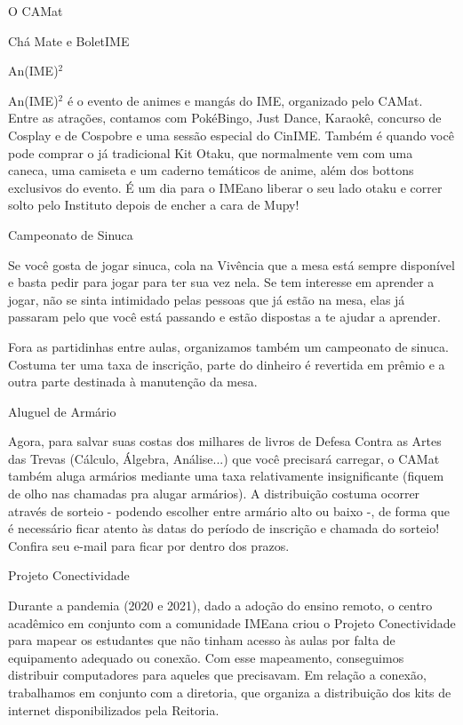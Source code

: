 \begin{secao}{O CAMat}
\begin{subsecao}{Chá Mate e BoletIME}
\end{subsecao}


\begin{subsecao}{An(IME)\texorpdfstring{$^2$}{²}}

An(IME)$^2$ é o evento de animes e mangás do IME, organizado pelo CAMat. Entre as atrações,
contamos com PokéBingo, Just Dance, Karaokê, concurso de Cosplay e de Cospobre e uma sessão 
especial do CinIME.
Também é quando você pode comprar o já tradicional Kit Otaku, que normalmente vem com uma
caneca, uma camiseta e um caderno temáticos de anime, além dos bottons exclusivos do evento.
É um dia para o IMEano liberar o seu lado otaku e correr solto pelo Instituto depois de
encher a cara de Mupy!

\end{subsecao}

\begin{subsecao}{Campeonato de Sinuca}

Se você gosta de jogar sinuca, cola na Vivência que a mesa está sempre disponível
e basta pedir para jogar para ter sua vez nela. Se tem interesse em aprender a jogar,
não se sinta intimidado pelas pessoas que já estão na mesa, elas já passaram pelo
que você está passando e estão dispostas a te ajudar a aprender.

Fora as partidinhas entre aulas, organizamos também um campeonato de sinuca. Costuma
ter uma taxa de inscrição, parte do dinheiro é revertida em prêmio e a outra parte
destinada à manutenção da mesa.

\end{subsecao}


\begin{subsecao}{Aluguel de Armário}

Agora, para salvar suas costas dos milhares de livros de Defesa Contra as Artes
das Trevas (Cálculo, Álgebra, Análise...) que você precisará carregar, o CAMat
também aluga armários mediante uma taxa relativamente insignificante (fiquem de olho
nas chamadas pra alugar armários). A distribuição costuma ocorrer através de sorteio -
podendo escolher entre armário alto ou baixo -, de forma que é necessário ficar atento
às datas do período de inscrição e chamada do sorteio! Confira seu e-mail para ficar por 
dentro dos prazos.

\end{subsecao}

\begin{subsecao}{Projeto Conectividade}

Durante a pandemia (2020 e 2021), dado a adoção do ensino remoto, o centro acadêmico em conjunto 
com a comunidade IMEana criou o Projeto Conectividade para mapear os estudantes que não tinham acesso
às aulas por falta de equipamento adequado ou conexão. Com esse mapeamento, conseguimos distribuir 
computadores para aqueles que precisavam. Em relação a conexão, trabalhamos em conjunto com a diretoria, 
que organiza a distribuição dos kits de internet disponibilizados pela Reitoria.


\end{subsecao}
\end{secao}
